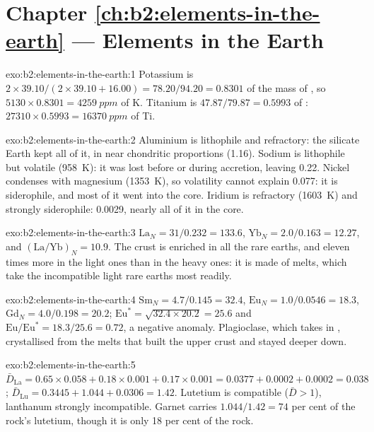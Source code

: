 \section*{Chapter \ref{ch:b2:elements-in-the-earth} --- Elements in the Earth}

\begin{solution}{exo:b2:elements-in-the-earth:1}
Potassium is $2\times39.10/(2\times39.10+16.00) = 78.20/94.20 = 0.8301$ of the mass of
, so $\num{5130}\times0.8301 = \qty{4259}{ppm}$ of K. Titanium is
$47.87/79.87 = 0.5993$ of : $\num{27310}\times0.5993 = \qty{16370}{ppm}$ of Ti.
\end{solution}

\begin{solution}{exo:b2:elements-in-the-earth:2}
Aluminium is lithophile and refractory: the silicate Earth kept all of it, in near
chondritic proportions (1.16). Sodium is lithophile but volatile (\qty{958}{K}): it was
lost before or during accretion, leaving 0.22. Nickel condenses with magnesium
(\qty{1353}{K}), so volatility cannot explain 0.077: it is siderophile, and most of it
went into the core. Iridium is refractory (\qty{1603}{K}) and strongly siderophile:
0.0029, nearly all of it in the core.
\end{solution}

\begin{solution}{exo:b2:elements-in-the-earth:3}
$\mathrm{La}_N = 31/0.232 = 133.6$, $\mathrm{Yb}_N = 2.0/0.163 = 12.27$, and
$(\mathrm{La}/\mathrm{Yb})_N = 10.9$. The crust is enriched in all the rare earths, and
eleven times more in the light ones than in the heavy ones: it is made of melts, which
take the incompatible light rare earths most readily.
\end{solution}

\begin{solution}{exo:b2:elements-in-the-earth:4}
$\mathrm{Sm}_N = 4.7/0.145 = 32.4$, $\mathrm{Eu}_N = 1.0/0.0546 = 18.3$,
$\mathrm{Gd}_N = 4.0/0.198 = 20.2$; $\mathrm{Eu}^* = \sqrt{32.4\times20.2} = 25.6$ and
$\mathrm{Eu}/\mathrm{Eu}^* = 18.3/25.6 = 0.72$, a negative anomaly. Plagioclase, which
takes in , crystallised from the melts that built the upper crust and stayed
deeper down.
\end{solution}

\begin{solution}{exo:b2:elements-in-the-earth:5}
$\bar D_{\mathrm{La}} = 0.65\times0.058+0.18\times0.001+0.17\times0.001 = 0.0377 +
0.0002 + 0.0002 = 0.038$; $\bar D_{\mathrm{Lu}} = 0.3445+1.044+0.0306 = 1.42$. Lutetium is
compatible ($\bar D > 1$), lanthanum strongly incompatible. Garnet carries
$1.044/1.42 = 74$ per cent of the rock's lutetium, though it is only 18 per cent of the
rock.
\end{solution}

